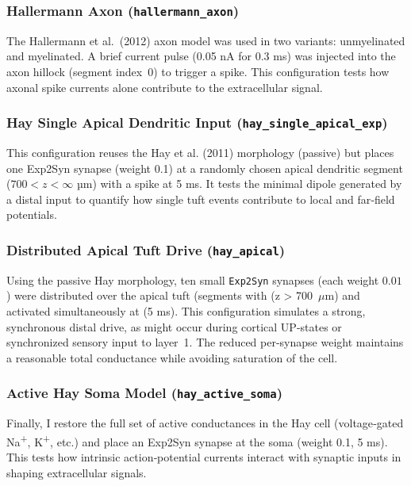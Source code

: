 \documentclass[final, a4paper,masters,en,listoffigures,listoftables,norwegiandates]{NMBU}
\begin{document}
\subsubsection{Hallermann Axon (\texttt{hallermann\_axon})}
\label{sec:hallermann_axon}
The Hallermann et al.\ (2012) axon model was used in two variants: unmyelinated and myelinated. A brief current pulse (0.05 nA for 0.3 ms) was injected into the axon hillock (segment index~0) to trigger a spike. This configuration tests how axonal spike currents alone contribute to the extracellular signal.

\subsubsection{Hay Single Apical Dendritic Input (\texttt{hay\_single\_apical\_exp})}
\label{subsubsec:hay_single_apical}
This configuration reuses the Hay et al. (2011) morphology (passive) but places one Exp2Syn synapse (weight 0.1) at a randomly chosen apical dendritic segment ($700<z<\infty$ µm) with a spike at 5 ms.  It tests the minimal dipole generated by a distal input to quantify how single tuft events contribute to local and far‐field potentials.

\subsubsection{Distributed Apical Tuft Drive (\texttt{hay\_apical})}
\label{sec:hay_apical}
Using the passive Hay morphology, ten small \texttt{Exp2Syn} synapses (each weight \(0.01\)) were distributed over the apical tuft (segments with (z > 700\ $\mu$m) and activated simultaneously at (5 ms). This configuration simulates a strong, synchronous distal drive, as might occur during cortical UP-states or synchronized sensory input to layer~1. The reduced per-synapse weight maintains a reasonable total conductance while avoiding saturation of the cell.

\subsubsection{Active Hay Soma Model (\texttt{hay\_active\_soma})}
\label{subsubsec:hay_active_soma}
Finally, I restore the full set of active conductances in the Hay cell (voltage‐gated Na\textsuperscript{+}, K\textsuperscript{+}, etc.) and place an Exp2Syn synapse at the soma (weight 0.1, 5 ms). This tests how intrinsic action‐potential currents interact with synaptic inputs in shaping extracellular signals.
\end{document}
